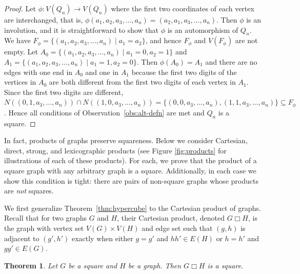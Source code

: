 \documentclass{article}
\newtheorem{theorem}{Theorem}[section]
\theoremstyle{definition}
\begin{document}
\begin{proof}
Let $\phi:V(Q_n)\rightarrow V(Q_n)$ where the first two coordinates of each vertex are 
interchanged, that is, $\phi(a_1, a_2, a_3,\ldots, a_n) = (a_2, a_1,a_3, \ldots, a_n)$. Then $\phi$ is an involution, and it is straightforward to show that $\phi$ is an automorphism of $Q_n$. We have $F_{\phi}
=\{(a_1, a_2, a_3,\ldots, a_n)\;|\;a_1=a_2\}$, and hence $F_{\phi}$ and $V(F_{\phi})$ are not empty. Let $A_0=\{(a_1, a_2, a_3,\ldots, a_n)\;|\;a_1=0, a_2=1\}$ and $A_1=\{(a_1, a_2, a_3,\ldots, a_n)\;|\;a_1=1, a_2=0\}$. Then $\phi(A_0)=A_1$ and there are no edges with one end in $A_0$ and one in $A_1$ because the first two digits of the vertices in $A_0$ are both different from the first two digits of each vertex in $A_1$. Since the first two digits are different, $N((0, 1, a_3,\ldots, a_n))\cap N((1, 0, a_3,\ldots, a_n))=\{(0,0,a_3, \ldots, a_n),(1,1,a_3, \ldots, a_n)\}\subseteq F_{\phi}$.  
Hence all conditions of Observation~\ref{obs:alt-defn} are met and $Q_n$ is a square. 
\end{proof}

In fact, products of graphs preserve squareness.  Below we consider Cartesian, direct, strong, and lexicographic products (see Figure \ref{fig:products} for illustrations of each of these products).  For each, we prove that the product of a square graph with any arbitrary graph is a square.  Additionally, in each case we show this condition is tight: there are pairs of non-square graphs whose products are \emph{not} squares.

We first generalize Theorem~\ref{thm:hypercube} to the Cartesian product of graphs. Recall that for two graphs $G$ and $H$, their Cartesian product, denoted $G \Box H$, is the graph with vertex set $V(G) \times V(H)$ and edge set such that $(g,h)$ is adjacent to $(g',h')$ exactly when either $g=g'$ and $hh' \in E(H)$ or $h=h'$ and $gg' \in E(G)$.

\begin{theorem} \label{thm:cartesian}
 Let $G$ be a square and $H$ be a graph. Then $G\Box H$ is a square.    
\end{theorem}
\end{document}

